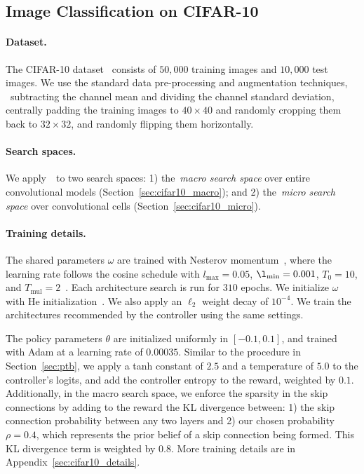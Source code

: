 \subsection{\label{sec:cifar10}Image Classification on CIFAR-10}
\paragraph{Dataset.} The CIFAR-10 dataset~\citep{cifar10} consists of $50,000$ training images and $10,000$ test images. We use the standard data pre-processing and augmentation techniques, \ie~subtracting the channel mean and dividing the channel standard deviation, centrally padding the training images to $40 \times 40$ and randomly cropping them back to $32 \times 32$, and randomly flipping them horizontally.

\paragraph{Search spaces.} We apply~\enas~to two search spaces: 1) the~\textit{macro search space} over entire convolutional models (Section~\ref{sec:cifar10_macro}); and 2) the~\textit{micro search space} over convolutional cells (Section~\ref{sec:cifar10_micro}).

\paragraph{Training details.} The shared parameters $\omega$ are trained with Nesterov momentum~\citep{nesterov}, where the learning rate follows the cosine schedule with $l_{\text{max}} = 0.05$, $\l_{\text{min}} = 0.001$, $T_0 = 10$, and $T_{\text{mul}} = 2$~\citep{cosine_lr}. Each architecture search is run for $310$ epochs. We initialize $\omega$ with He initialization~\citep{he_init}. We also apply an $\ell_2$ weight decay of $10^{-4}$. We train the architectures recommended by the controller using the same settings.

The policy parameters $\theta$ are initialized uniformly in $[-0.1, 0.1]$, and trained with Adam at a learning rate of $0.00035$. Similar to the procedure in Section~\ref{sec:ptb}, we apply a tanh constant of $2.5$ and a temperature of $5.0$ to the controller's logits, and add the controller entropy to the reward, weighted by $0.1$. Additionally, in the macro search space, we enforce the sparsity in the skip connections by adding to the reward the KL divergence between: 1) the skip connection probability between any two layers and 2) our chosen probability $\rho = 0.4$, which represents the prior belief of a skip connection being formed. This KL divergence term is weighted by $0.8$. More training details are in Appendix~\ref{sec:cifar10_details}.

